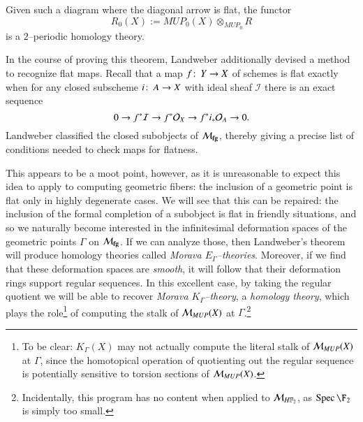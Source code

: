 \begin{theorem}[Landweber]\label{LandwebersStackyTheorem}
Given such a diagram where the diagonal arrow is flat, the functor \[R_0(X) := MUP_0(X) \otimes_{MUP_0} R\] is a $2$--periodic homology theory.
\end{theorem}

In the course of proving this theorem, Landweber additionally devised a method to recognize flat maps.  Recall that a map $f\colon\thinspace Y \to X$ of schemes is flat exactly when for any closed subscheme $i\colon\thinspace A \to X$ with ideal sheaf $\mathcal I$ there is an exact sequence \[0 \to f^* \mathcal{I} \to f^* \mathcal{O}_X \to f^* i_* \mathcal{O}_A \to 0.\]  Landweber classified the closed subobjects of $\mathcal{M}_{\mathbf{fg}}$, thereby giving a precise list of conditions needed to check maps for flatness.

This appears to be a moot point, however, as it is unreasonable to expect this idea to apply to computing geometric fibers: the inclusion of a geometric point is flat only in highly degenerate cases.  We will see that this can be repaired: the inclusion of the formal completion of a subobject is flat in friendly situations, and so we naturally become interested in the infinitesimal deformation spaces of the geometric points $\Gamma$ on $\mathcal{M}_{\mathbf{fg}}$.  If we can analyze those, then Landweber's theorem will produce homology theories called \textit{Morava $E_\Gamma$--theories}.  Moreover, if we find that these deformation spaces are \emph{smooth}, it will follow that their deformation rings support regular sequences.  In this excellent case, by taking the regular quotient we will be able to recover \textit{Morava $K_\Gamma$--theory}, a \emph{homology theory}, which plays the role\footnote{To be clear: $K_\Gamma(X)$ may not actually compute the literal stalk of $\mathcal{M}_{MUP}(X)$ at $\Gamma$, since the homotopical operation of quotienting out the regular sequence is potentially sensitive to torsion sections of $\mathcal{M}_{MUP}(X)$.} of computing the stalk of $\mathcal{M}_{MUP}(X)$ at $\Gamma$.\footnote{Incidentally, this program has no content when applied to $\context{\HFtwo}$, as $\Spec \F_2$ is simply too small.}

